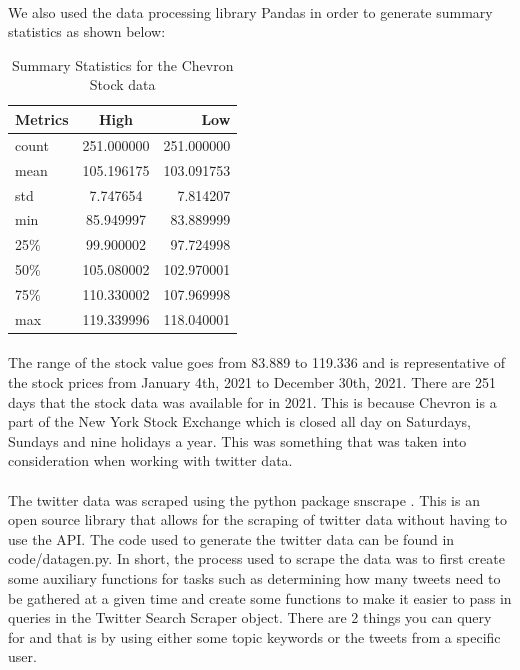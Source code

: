 \documentclass[12pt, letterpaper, titlepage]{article}
\begin{document}
\paragraph{}
	We also used the data processing library Pandas in order to generate summary statistics as shown below:

\begin{table}[!hb]
  \begin{center}
    \caption{Summary Statistics for the Chevron Stock data}
    \label{tab:table1}
    \begin{tabular}{l|c|r} %
      \textbf{Metrics} & \textbf{High} & \textbf{Low}\\
      \hline
      count & 251.000000 & 251.000000\\
      mean & 105.196175 & 103.091753\\
      std & 7.747654 & 7.814207\\
      min & 85.949997 & 83.889999\\
      25\% & 99.900002 & 97.724998\\
      50\% & 105.080002 & 102.970001\\
      75\% & 110.330002 & 107.969998\\
      max & 119.339996 & 118.040001\\
    \end{tabular}
  \end{center}
\end{table}

	
\paragraph{}
	The range of the stock value goes from 83.889 to 119.336 and is representative of the stock prices from January 4th, 2021 to December 30th, 2021. There are 251 days that the stock data was available for in 2021. This is because Chevron is a part of the New York Stock Exchange which is closed all day on Saturdays, Sundays and nine holidays a year. This was something that was taken into consideration when working with twitter data. 

\paragraph{}
	The twitter data was scraped using the python package snscrape \citep{justanotherarchivist_2022}. This is an open source library that allows for the scraping of twitter data without having to use the API. The code used to generate the twitter data can be found in code/datagen.py. In short, the process used to scrape the data was to first create some auxiliary functions for tasks such as determining how many tweets need to be gathered at a given time and create some functions to make it easier to pass in queries in the Twitter Search Scraper object. There are 2 things you can query for and that is by using either some topic keywords or the tweets from a specific user. 
	
\end{document}
